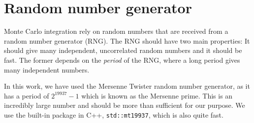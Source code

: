 \section{Random number generator}
Monte Carlo integration rely on random numbers that are received from a random number generator (RNG). The RNG should have two main properties: It should give many independent, uncorrelated random numbers and it should be fast. The former depends on the \textit{period} of the RNG, where a long period gives many independent numbers. 

In this work, we have used the Mersenne Twister random number generator, as it has a period of $2^{19937}-1$ which is known as the Mersenne prime. This is an incredibly large number and should be more than sufficient for our purpose. We use the built-in package in C++, \lstinline|std::mt19937|, which is also quite fast.